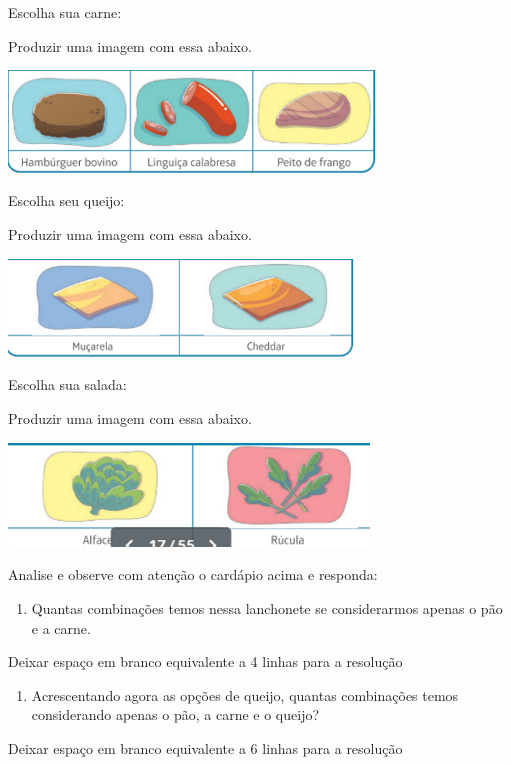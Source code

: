 Escolha sua carne:

Produzir uma imagem com essa abaixo.

\includegraphics[width=3.86538in,height=1.06976in]{media/image135.png}

Escolha seu queijo:

Produzir uma imagem com essa abaixo.

\includegraphics[width=3.64103in,height=1.02299in]{media/image136.png}

Escolha sua salada:

Produzir uma imagem com essa abaixo.

\includegraphics[width=3.76923in,height=1.08430in]{media/image137.png}

Analise e observe com atenção o cardápio acima e responda:

\begin{enumerate}
\def\labelenumi{\alph{enumi})}
\item
  Quantas combinações temos nessa lanchonete se considerarmos apenas o
  pão e a carne.
\end{enumerate}

Deixar espaço em branco equivalente a 4 linhas para a resolução

\begin{enumerate}
\def\labelenumi{\alph{enumi})}
\item
  Acrescentando agora as opções de queijo, quantas combinações temos
  considerando apenas o pão, a carne e o queijo?
\end{enumerate}

Deixar espaço em branco equivalente a 6 linhas para a resolução

